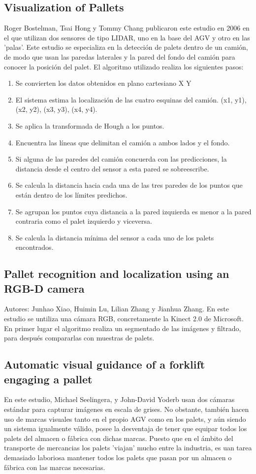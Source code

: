 \begin{itemize}
\subsection{Visualization of Pallets}
Roger Bostelman, Tsai Hong y Tommy Chang publicaron este estudio en 2006 en el que utilizan dos sensores de tipo LIDAR, uno en la base del AGV y otro en las 'palas'.
Este estudio se especializa en la detección de palets dentro de un camión, de modo que usan las paredas laterales y la pared del fondo del camión para conocer la posición del palet.
El algoritmo utilizado realiza los siguientes pasos:
\begin{enumerate}
\item Se convierten los datos obtenidos en plano cartesiano X Y
\item El sistema estima la localización de las cuatro esquinas del camión. (x1, y1), (x2, y2), (x3, y3), (x4, y4).
\item Se aplica la transformada de Hough a los puntos.
\item Encuentra las líneas que delimitan el camión a ambos lados y el fondo.
\item Si alguna de las paredes del camión concuerda con las predicciones, la distancia desde el centro del sensor a esta pared se sobreescribe.
\item Se calcula la distancia hacia cada una de las tres paredes de los puntos que están dentro de los límites predichos.
\item Se agrupan los puntos cuya distancia a la pared izquierda es menor a la pared contraria como el palet izquierdo y viceversa.
\item Se calcula la distancia mínima del sensor a cada uno de los palets encontrados.
\end{enumerate}

 \subsection{Pallet recognition and localization using an RGB-D camera}
Autores: Junhao Xiao, Huimin Lu, Lilian Zhang y Jianhua Zhang.
En este estudio se untiliza una cámara RGB, concretamente la Kinect 2.0 de Microsoft.
En primer lugar el algoritmo realiza un segmentado de las imágenes y filtrado, para después compararlas con muestras de palets.

\subsection{Automatic visual guidance of a forklift engaging a pallet}
En este estudio, Michael Seelingera, y John-David Yoderb usan dos cámaras estándar para capturar imágenes en escala de grises.
No obstante, también hacen uso de marcas visuales tanto en el propio AGV como en los palets, y aún siendo un sistema igualmente válido, posee la desventaja de tener que equipar todos los palets del almacen o fábrica con dichas marcas. Puesto que en el ámbito del transporte de mercancias los palets 'viajan' mucho entre la industria, es uan tarea demasiado laboriosa mantener todos los palets que pasan por un almacen o fábrica con las marcas necesarias.


\end{itemize}
